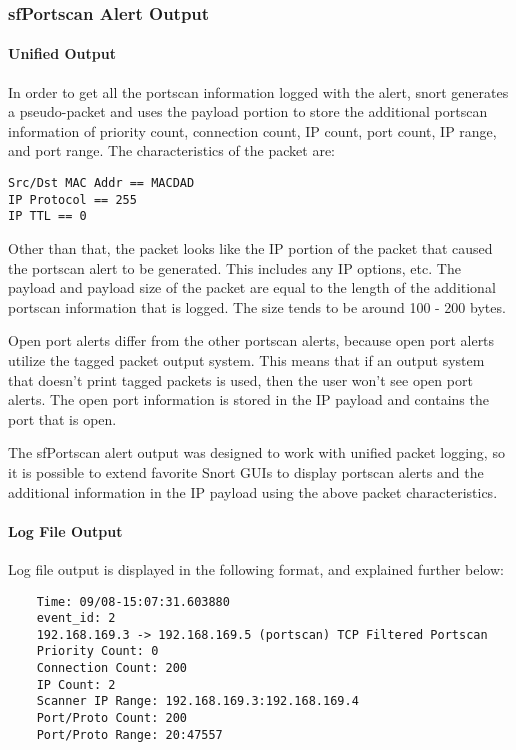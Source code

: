 \documentclass[english]{report}
\begin{document}
\subsubsection{sfPortscan Alert Output\label{sfportscan alert output}}

\paragraph{Unified Output}


In order to get all the portscan information logged with the alert, snort
generates a pseudo-packet and uses the payload portion to store the additional
portscan information of priority count, connection count, IP count, port count,
IP range, and port range.  The characteristics of the packet are:

\begin{verbatim}
Src/Dst MAC Addr == MACDAD
IP Protocol == 255
IP TTL == 0
\end{verbatim}

Other than that, the packet looks like the IP portion of the packet that caused
the portscan alert to be generated.  This includes any IP options, etc.  The
payload and payload size of the packet are equal to the length of the additional
portscan information that is logged.  The size tends to be around 100 - 200
bytes.

Open port alerts differ from the other portscan alerts, because open port alerts
utilize the tagged packet output system.  This means that if an output system
that doesn't print tagged packets is used, then the user won't see open port
alerts.  The open port information is stored in the IP payload and
contains the port that is open.

The sfPortscan alert output was designed to work with unified packet logging, so
it is possible to extend favorite Snort GUIs to display portscan alerts and the
additional information in the IP payload using the above packet characteristics.

\paragraph{Log File Output}

Log file output is displayed in the following format, and explained further
below:

\begin{verbatim}
	Time: 09/08-15:07:31.603880
	event_id: 2
	192.168.169.3 -> 192.168.169.5 (portscan) TCP Filtered Portscan
	Priority Count: 0
	Connection Count: 200
	IP Count: 2
	Scanner IP Range: 192.168.169.3:192.168.169.4
	Port/Proto Count: 200
	Port/Proto Range: 20:47557
\end{verbatim}
\end{document}
